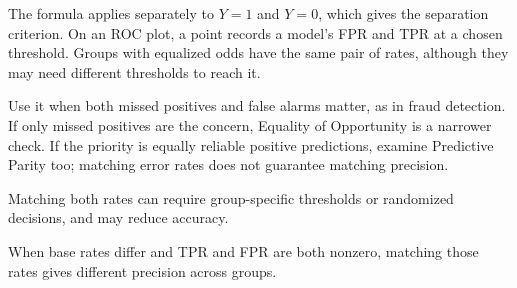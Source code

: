 \begin{metricformula}
\end{metricformula}

The formula applies separately to $Y=1$ and $Y=0$, which gives the separation criterion. On an ROC plot, a point records a model's FPR and TPR at a chosen threshold. Groups with equalized odds have the same pair of rates, although they may need different thresholds to reach it.


Use it when both missed positives and false alarms matter, as in fraud detection. If only missed positives are the concern, Equality of Opportunity is a narrower check. If the priority is equally reliable positive predictions, examine Predictive Parity too; matching error rates does not guarantee matching precision.


{
\item Matching both rates can require group-specific thresholds or randomized decisions, and may reduce accuracy.
\item When base rates differ and TPR and FPR are both nonzero, matching those rates gives different precision across groups.
}

\metricsecondpage

\thispagestyle{customstyle}

